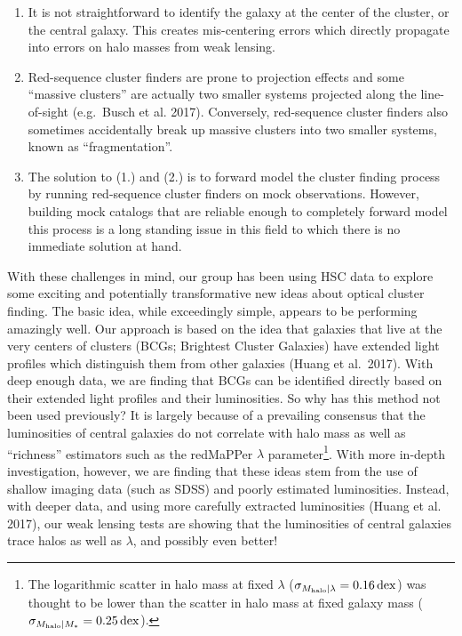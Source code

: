 \documentclass[letterpaper,12pt]{article}
\begin{document}
\begin{enumerate}
\item It is not straightforward to identify the galaxy at the center of the cluster, or the central galaxy. This
creates mis-centering errors which directly propagate into errors on halo masses from weak lensing.
\item Red-sequence cluster finders are prone to projection effects and some ``massive clusters'' are actually two
smaller systems projected along the line-of-sight (e.g.\ Busch et al. 2017). Conversely, red-sequence cluster finders
also sometimes accidentally break up massive clusters into two smaller systems, known as ``fragmentation''.
\item The solution to (1.) and (2.) is to forward model the cluster finding process by running red-sequence cluster
finders on mock observations. However, building mock catalogs that are reliable enough to completely forward model this
process is a long standing issue in this field to which there is no immediate solution at hand.
\end{enumerate}

With these challenges in mind, our group has been using HSC data to explore some exciting and potentially
transformative new ideas about optical cluster finding. The basic idea, while exceedingly simple, appears to be
performing amazingly well. Our approach is based on the idea that galaxies that live at the very centers of clusters
(BCGs; Brightest Cluster Galaxies) have extended light profiles which distinguish them from other galaxies
(Huang et al.~2017). With deep enough data, we are finding that BCGs can be identified directly based on
their extended light profiles and their luminosities. So why has this method not been used previously? It is largely
because of a prevailing consensus that the luminosities of central galaxies do not correlate with halo mass as well as
``richness'' estimators such as the redMaPPer $\lambda$ parameter\footnote{The logarithmic scatter in halo mass at
fixed $\lambda$ ($\sigma_{M_{\rm halo}|\lambda}=0.16\,{\rm dex}$) was thought to be lower than the scatter in halo mass
at fixed galaxy mass ($\sigma_{M_{\rm halo}|M_*}=0.25\,{\rm dex}$).}. With more in-depth investigation, however, we are
finding that these ideas stem from the use of shallow imaging data (such as SDSS) and poorly estimated luminosities.
Instead, with deeper data, and using more carefully extracted luminosities (Huang et al. 2017), our weak lensing tests
are showing that the luminosities of central galaxies trace halos as well as $\lambda$, and possibly even better!
\end{document}
